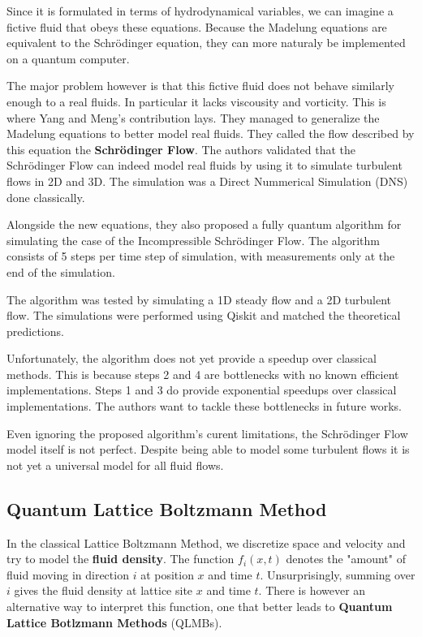 \documentclass[conference]{IEEEtran}
\begin{document}
Since it is formulated in terms of hydrodynamical variables, we can imagine a fictive fluid that obeys these equations. Because the Madelung equations are equivalent to the Schrödinger equation, they can more naturaly be implemented on a quantum computer.

The major problem however is that this fictive fluid does not behave similarly enough to a real fluids. In particular it lacks viscousity and vorticity.
This is where Yang and Meng's contribution lays. They managed to generalize the Madelung equations to better model real fluids.
They called the flow described by this equation the \textbf{Schrödinger Flow}.
The authors validated that the Schrödinger Flow can indeed model real fluids by using it to simulate turbulent flows in 2D and 3D. The simulation was a Direct Nummerical Simulation (DNS) done classically.

Alongside the new equations, they also proposed a fully quantum algorithm for simulating the case of the Incompressible Schrödinger Flow.
The algorithm consists of 5 steps per time step of simulation, with measurements only at the end of the simulation.

The algorithm was tested by simulating a 1D steady flow and a 2D turbulent flow.
The simulations were performed using Qiskit \cite{qiskit2024} and matched the theoretical predictions.

Unfortunately, the algorithm does not yet provide a speedup over classical methods. This is because steps 2 and 4 are bottlenecks with no known efficient implementations.
Steps 1 and 3 do provide exponential speedups over classical implementations. 
The authors want to tackle these bottlenecks in future works.

Even ignoring the proposed algorithm's curent limitations, the Schrödinger Flow model itself is not perfect.
Despite being able to model some turbulent flows it is not yet a universal model for all fluid flows.

\subsection{Quantum Lattice Boltzmann Method}
In the classical Lattice Boltzmann Method, we discretize space and velocity and try to model the \textbf{fluid density}.
The function $f_{i}(x,t)$ denotes the "amount" of fluid moving in direction $i$ at position $x$ and time $t$.
Unsurprisingly, summing over $i$ gives the fluid density at lattice site $x$ and time $t$.
There is however an alternative way to interpret this function, one that better leads to \textbf{Quantum Lattice Botlzmann Methods} (QLMBs).
\end{document}
